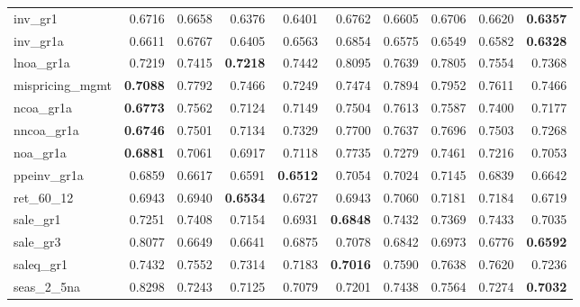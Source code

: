 \begin{longtable}{>{\raggedright\arraybackslash}p{2.6cm}rrrrrrrrr}
inv\_gr1 & 0.6716 & \cellcolor{blue!10}0.6658 & \cellcolor{blue!10}0.6376 & \cellcolor{blue!10}0.6401 & 0.6762 & \cellcolor{blue!10}0.6605 & \cellcolor{blue!10}0.6706 & \cellcolor{blue!10}0.6620 & \textbf{\cellcolor{blue!10}0.6357} \\
inv\_gr1a & 0.6611 & 0.6767 & \cellcolor{blue!10}0.6405 & \cellcolor{blue!10}0.6563 & 0.6854 & \cellcolor{blue!10}0.6575 & \cellcolor{blue!10}0.6549 & \cellcolor{blue!10}0.6582 & \textbf{\cellcolor{blue!10}0.6328} \\
lnoa\_gr1a & 0.7219 & 0.7415 & \textbf{\cellcolor{blue!10}0.7218} & 0.7442 & 0.8095 & 0.7639 & 0.7805 & 0.7554 & 0.7368 \\
mispricing\_mgmt & \textbf{0.7088} & 0.7792 & 0.7466 & 0.7249 & 0.7474 & 0.7894 & 0.7952 & 0.7611 & 0.7466 \\
ncoa\_gr1a & \textbf{0.6773} & 0.7562 & 0.7124 & 0.7149 & 0.7504 & 0.7613 & 0.7587 & 0.7400 & 0.7177 \\
nncoa\_gr1a & \textbf{0.6746} & 0.7501 & 0.7134 & 0.7329 & 0.7700 & 0.7637 & 0.7696 & 0.7503 & 0.7268 \\
noa\_gr1a & \textbf{0.6881} & 0.7061 & 0.6917 & 0.7118 & 0.7735 & 0.7279 & 0.7461 & 0.7216 & 0.7053 \\
ppeinv\_gr1a & 0.6859 & \cellcolor{blue!10}0.6617 & \cellcolor{blue!10}0.6591 & \textbf{\cellcolor{blue!10}0.6512} & 0.7054 & 0.7024 & 0.7145 & \cellcolor{blue!10}0.6839 & \cellcolor{blue!10}0.6642 \\
ret\_60\_12 & 0.6943 & \cellcolor{blue!10}0.6940 & \textbf{\cellcolor{blue!10}0.6534} & \cellcolor{blue!10}0.6727 & 0.6943 & 0.7060 & 0.7181 & 0.7184 & \cellcolor{blue!10}0.6719 \\
sale\_gr1 & 0.7251 & 0.7408 & \cellcolor{blue!10}0.7154 & \cellcolor{blue!10}0.6931 & \textbf{\cellcolor{blue!10}0.6848} & 0.7432 & 0.7369 & 0.7433 & \cellcolor{blue!10}0.7035 \\
sale\_gr3 & 0.8077 & \cellcolor{blue!10}0.6649 & \cellcolor{blue!10}0.6641 & \cellcolor{blue!10}0.6875 & \cellcolor{blue!10}0.7078 & \cellcolor{blue!10}0.6842 & \cellcolor{blue!10}0.6973 & \cellcolor{blue!10}0.6776 & \textbf{\cellcolor{blue!10}0.6592} \\
saleq\_gr1 & 0.7432 & 0.7552 & \cellcolor{blue!10}0.7314 & \cellcolor{blue!10}0.7183 & \textbf{\cellcolor{blue!10}0.7016} & 0.7590 & 0.7638 & 0.7620 & \cellcolor{blue!10}0.7236 \\
seas\_2\_5na & 0.8298 & \cellcolor{blue!10}0.7243 & \cellcolor{blue!10}0.7125 & \cellcolor{blue!10}0.7079 & \cellcolor{blue!10}0.7201 & \cellcolor{blue!10}0.7438 & \cellcolor{blue!10}0.7564 & \cellcolor{blue!10}0.7274 & \textbf{\cellcolor{blue!10}0.7032} \\

\end{longtable}
